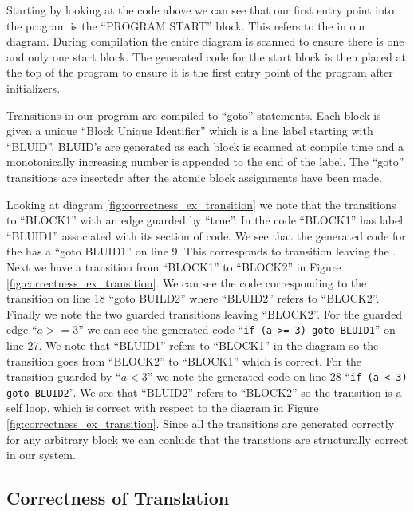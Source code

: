Starting by looking at the code above we can see that our first entry point into the 
program is the ``PROGRAM START'' block. This refers to the  
in our diagram. During compilation the entire diagram is scanned to ensure there 
is one and only one start block. The generated code for the start block is then 
placed at the top of the program to ensure it is the first entry point of the 
program after initializers. 

Transitions in our program are compiled to ``goto'' statements. Each block is 
given a unique ``Block Unique Identifier'' which is a line label starting with 
``BLUID''. BLUID's are generated as each block is scanned at compile time and 
a monotonically increasing number is appended to the end of the label. The 
``goto'' transitions are insertedr after the atomic block assignments have been made.

Looking at diagram \ref{fig:correctness_ex_transition} we note that the  
transitions to ``BLOCK1'' with an edge guarded by ``true''. In the code ``BLOCK1'' has label 
``BLUID1'' associated with its section of code. We see that the generated code for the 
has a ``goto BLUID1'' on line 9. This corresponds to transition leaving the . 
Next we have a transition from ``BLOCK1'' to ``BLOCK2'' in Figure \ref{fig:correctness_ex_transition}. 
We can see the code corresponding to the transition on line 18 ``goto BUILD2'' where 
``BLUID2'' refers to ``BLOCK2''. Finally we note the two guarded transitions 
leaving ``BLOCK2''. For the guarded edge ``$a >= 3$'' we can see the generated 
code ``\texttt{if (a >= 3) goto BLUID1}'' on line 27. We note that ``BLUID1'' refers 
to ``BLOCK1'' in the diagram so the transition goes from ``BLOCK2'' to ``BLOCK1'' 
which is correct. For the transition guarded by ``$a < 3$'' we note the generated code 
on line 28 ``\texttt{if (a < 3) goto BLUID2}''. We see that ``BLUID2'' refers to ``BLOCK2'' 
so the transition is a self loop, which is correct with respect to the diagram in 
Figure \ref{fig:correctness_ex_transition}. Since all the transitions are generated correctly for
any arbitrary block we can conlude that the transtions are structurally correct in our system.





\clearpage
\subsection{Correctness of Translation}


